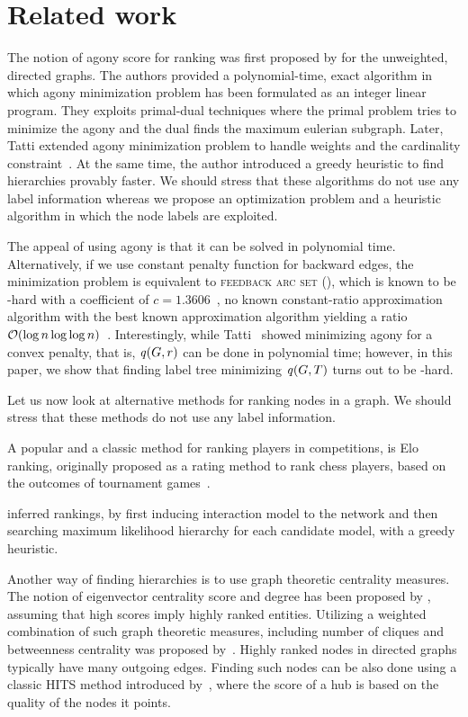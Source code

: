 \section{Related work}\label{sec:related}

The notion of agony score for  ranking was first proposed by \citet{gupte2011finding} for
the unweighted, directed graphs. The authors provided a
polynomial-time, exact algorithm in which agony minimization problem has been
formulated as an integer linear program. They exploits primal-dual techniques
where the primal problem tries to minimize the agony and  the dual  finds the
maximum eulerian subgraph. Later, Tatti extended agony minimization problem
to handle weights and the cardinality constraint~\cite{nikolaj2017tiers}. At the same time, the author  introduced a
greedy heuristic  to find hierarchies provably  faster.
We should stress that these algorithms do not use any label information whereas
we propose an optimization problem and a heuristic algorithm in which the node
labels are exploited.


The appeal of using agony is that it can be solved in polynomial time.
Alternatively, if we use
constant penalty function for backward edges, the minimization problem is equivalent to \textsc{feedback arc set}
(\fasprb), which is known to be \apx-hard with a coefficient of $c =
1.3606$~\cite{dinur2005hardness}, no known constant-ratio
approximation algorithm with the best known approximation algorithm
yielding a ratio $\bigO{\log n \log \log n}$~\cite{even1998approximating}. Interestingly, while
Tatti~\cite{nikolaj2017tiers} showed
minimizing agony for a convex penalty, that is, $\score{G, r}$ can be done
in polynomial time; however, in this paper, we show that finding label tree
minimizing $\labelscore{G, T}$ turns out to be \np-hard.

Let us now look at alternative methods for ranking nodes in a graph.
We should stress that these methods do not use any label information.

A popular and a classic method for ranking players in competitions, is Elo
ranking, originally proposed as a rating method to rank chess players, based on
the outcomes of tournament games~\cite{elo1978rating}. 

\citet{maiya2009inferring} inferred  rankings, by first inducing interaction
model to the network and then searching maximum likelihood hierarchy  for each
candidate model, with a greedy heuristic.

Another way of finding hierarchies is to use graph theoretic centrality
measures. The notion of  eigenvector centrality score and degree has been
proposed by \citet{memon2008retracted}, assuming that high scores imply  highly
ranked entities. Utilizing a weighted combination of such graph theoretic
measures, including  number of cliques and betweenness  centrality was proposed
by~\citet{rowe2007automated}.
Highly ranked nodes in directed graphs typically have many outgoing edges.
Finding such nodes can be also done using a classic HITS method introduced
by~\citet{kleinberg1999authoritative}, where the score of a hub is based on the quality
of the nodes it points.
